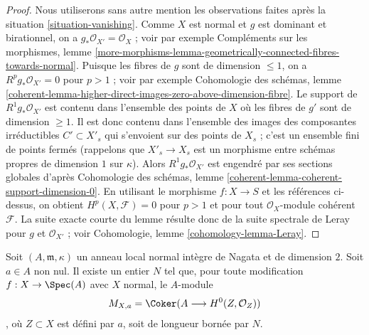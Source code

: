 \begin{proof} Nous utiliserons sans autre mention les observations faites après la situation \ref{situation-vanishing}. Comme $X$ est normal et $g$ est dominant et birationnel, on a $g_*\mathcal{O}_{X'} = \mathcal{O}_X$ ; voir par exemple Compléments sur les morphismes, lemme \ref{more-morphisms-lemma-geometrically-connected-fibres-towards-normal}. Puisque les fibres de $g$ sont de dimension $\leq 1$, on a $R^pg_*\mathcal{O}_{X'} = 0$ pour $p > 1$ ; voir par exemple Cohomologie des schémas, lemme \ref{coherent-lemma-higher-direct-images-zero-above-dimension-fibre}. Le support de $R^1g_*\mathcal{O}_{X'}$ est contenu dans l'ensemble des points de $X$ où les fibres de $g'$ sont de dimension $\geq 1$. Il est donc contenu dans l'ensemble des images des composantes irréductibles $C' \subset X'_s$ qui s'envoient sur des points de $X_s$ ; c'est un ensemble fini de points fermés (rappelons que $X'_s \to X_s$ est un morphisme entre schémas propres de dimension $1$ sur $\kappa$). Alors $R^1g_*\mathcal{O}_{X'}$ est engendré par ses sections globales d'après Cohomologie des schémas, lemme \ref{coherent-lemma-coherent-support-dimension-0}. En utilisant le morphisme $f : X \to S$ et les références ci-dessus, on obtient $H^p(X, \mathcal{F}) = 0$ pour $p > 1$ et pour tout $\mathcal{O}_X$-module cohérent $\mathcal{F}$. La suite exacte courte du lemme résulte donc de la suite spectrale de Leray pour $g$ et $\mathcal{O}_{X'}$ ; voir Cohomologie, lemme \ref{cohomology-lemma-Leray}. \end{proof}

\begin{lemma} \label{lemma-bound-a-torsion} Soit $(A, \mathfrak m, \kappa)$ un anneau local normal intègre de Nagata et de dimension $2$. Soit $a \in A$ non nul. Il existe un entier $N$ tel que, pour toute modification $f : X \to \Spec(A)$ avec $X$ normal, le $A$-module $$
M_{X, a} = \Coker(A \longrightarrow H^0(Z, \mathcal{O}_Z))
$$, où $Z \subset X$ est défini par $a$, soit de longueur bornée par $N$. \end{lemma}

